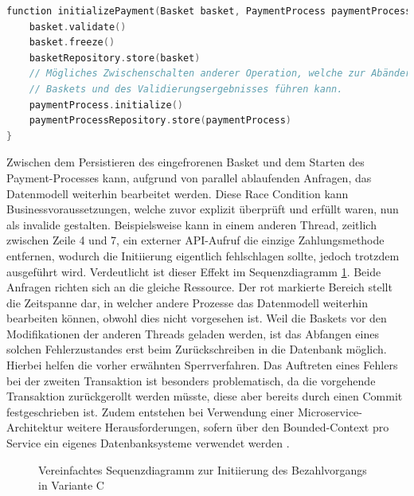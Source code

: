 \begin{minipage}{\linewidth} %
	\begin{lstlisting}[caption={Getrennte Transaktionen für die Initiierung des Bezahlvorgangs}, label={lst:eventualConsistency}, language=Kotlin]
function initializePayment(Basket basket, PaymentProcess paymentProcess) {
	basket.validate()
	basket.freeze()
	basketRepository.store(basket)
	// Mögliches Zwischenschalten anderer Operation, welche zur Abänderung des
	// Baskets und des Validierungsergebnisses führen kann.
	paymentProcess.initialize()
	paymentProcessRepository.store(paymentProcess)
}
	\end{lstlisting}
\end{minipage}

Zwischen dem Persistieren des eingefrorenen Basket und dem Starten des Payment-Processes kann, aufgrund von parallel ablaufenden Anfragen, das Datenmodell weiterhin bearbeitet werden. Diese \Gls{Race Condition} kann Businessvoraussetzungen, welche zuvor explizit überprüft und erfüllt waren, nun als invalide gestalten. Beispielsweise kann in einem anderen Thread, zeitlich zwischen Zeile 4 und 7, ein externer API-Aufruf die einzige Zahlungsmethode entfernen, wodurch die Initiierung eigentlich fehlschlagen sollte, jedoch trotzdem ausgeführt wird. Verdeutlicht ist dieser Effekt im Sequenzdiagramm \ref{fig:VarC-Sequence-Alt}. Beide Anfragen richten sich an die gleiche Ressource. Der rot markierte Bereich stellt die Zeitspanne dar, in welcher andere Prozesse das Datenmodell weiterhin bearbeiten können, obwohl dies nicht vorgesehen ist. Weil die Baskets vor den Modifikationen der anderen Threads geladen werden, ist das Abfangen eines solchen Fehlerzustandes erst beim Zurückschreiben in die Datenbank möglich. Hierbei helfen die vorher erwähnten Sperrverfahren. Das Auftreten eines Fehlers bei der zweiten Transaktion ist besonders problematisch, da die vorgehende Transaktion zurückgerollt werden müsste, diese aber bereits durch einen Commit festgeschrieben ist. Zudem entstehen bei Verwendung einer Microservice-Architektur weitere Herausforderungen, sofern über den Bounded-Context pro Service ein eigenes Datenbanksysteme verwendet werden \cite{Fowler.2014}. 

\begin{figure}[htbp]
	\centering
	
	\caption{Vereinfachtes Sequenzdiagramm zur Initiierung des Bezahlvorgangs in Variante C}
	\label{fig:VarC-Sequence-Alt}
\end{figure}

